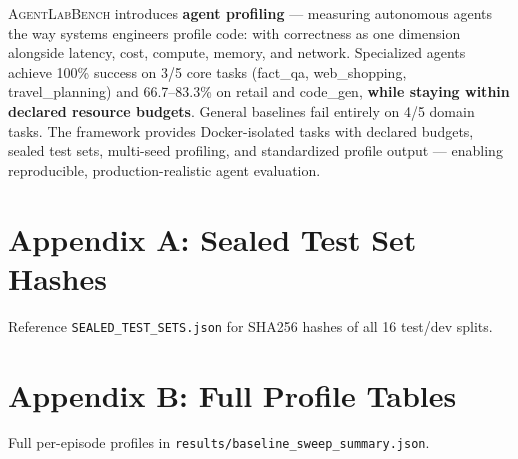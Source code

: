 \documentclass[letterpaper, 10 pt, conference]{ieeeconf}
\newcommand{\agentslabench}{\textsc{AgentLabBench}}
\begin{document}
\agentslabench{} introduces \textbf{agent profiling} --- measuring autonomous agents the way systems engineers profile code: with correctness as one dimension alongside latency, cost, compute, memory, and network. Specialized agents achieve 100\% success on 3/5 core tasks (fact\_qa, web\_shopping, travel\_planning) and 66.7--83.3\% on retail and code\_gen, \textbf{while staying within declared resource budgets}. General baselines fail entirely on 4/5 domain tasks. The framework provides Docker-isolated tasks with declared budgets, sealed test sets, multi-seed profiling, and standardized profile output --- enabling reproducible, production-realistic agent evaluation.




\appendix
\section*{Appendix A: Sealed Test Set Hashes}
Reference \texttt{SEALED\_TEST\_SETS.json} for SHA256 hashes of all 16 test/dev splits.

\section*{Appendix B: Full Profile Tables}
Full per-episode profiles in \texttt{results/baseline\_sweep\_summary.json}.
\end{document}
